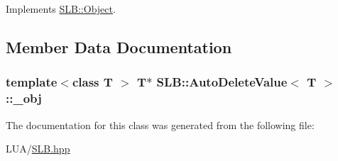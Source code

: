 Implements \hyperlink{classSLB_1_1Object_a3dddf6a764c19ed37f6af797f0b0b453}{S\+L\+B\+::\+Object}.



\subsection{Member Data Documentation}
\subsubsection[{\texorpdfstring{\+\_\+obj}{_obj}}]{\setlength{\rightskip}{0pt plus 5cm}template$<$class T $>$ T$\ast$ {\bf S\+L\+B\+::\+Auto\+Delete\+Value}$<$ T $>$\+::\+\_\+obj\hspace{0.3cm}{\ttfamily [private]}}\hypertarget{classSLB_1_1AutoDeleteValue_a224f235ac74e3c3377a9b53066b3df17}{}\label{classSLB_1_1AutoDeleteValue_a224f235ac74e3c3377a9b53066b3df17}


The documentation for this class was generated from the following file\+:\begin{DoxyCompactItemize}
\item 
L\+U\+A/\hyperlink{SLB_8hpp}{S\+L\+B.\+hpp}\end{DoxyCompactItemize}
